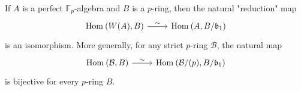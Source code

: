 \begin{prop}\label{UPWittVectors}
	If $A$ is a perfect $\mathbb{F}_p$-algebra and $B$ is a $p$-ring,
	then the natural "reduction" map 
	\begin{equation*}
	\begin{tikzcd}
		\Hom_{  } \left( W(A), B \right)
		\arrow[r, "\sim", rightarrow] &
		\Hom_{  } \left( A, B/\mathfrak{b}_1 \right)
	\end{tikzcd}
	\end{equation*}
	is an isomorphism.
	More generally, for any strict $p$-ring $\mathcal{B}$, the natural map
	\begin{equation*}
	\begin{tikzcd}
		\Hom_{  } \left( \mathcal{B}, B \right)
		\arrow[r, "\sim", rightarrow] &
		\Hom_{  } \left( \mathcal{B}/ (p), B/\mathfrak{b}_1 \right)
	\end{tikzcd}
	\end{equation*}
	is bijective for every $p$-ring $B$.
\end{prop}


